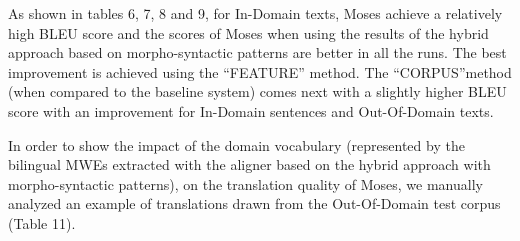 \documentclass[output=paper,modfonts,nonflat]{langsci/langscibook}
\begin{document}
\begin{table}

\caption{BLEU scores of Moses when using the results of the hybrid approach based on linear programming and using a bilingual dictionary.}
\label{tab:SMT4}
\end{table}

As shown in tables 6, 7, 8 and 9, for In-Domain texts, Moses achieve a relatively high BLEU score and the scores of Moses when using the results of the hybrid approach based on morpho-syntactic patterns are better in all the runs. The best improvement is achieved using the ``FEATURE'' method. %
The ``CORPUS''method (when compared to the baseline system) comes next with a slightly higher BLEU score with an improvement %
for In-Domain sentences and %
Out-Of-Domain texts.

In order to show the impact of the domain vocabulary (represented by the bilingual MWEs extracted with the aligner based on the hybrid approach with morpho-syntactic patterns), on the translation quality of Moses, we manually analyzed an example of translations drawn from the Out-Of-Domain test corpus (Table 11).
\end{document}
